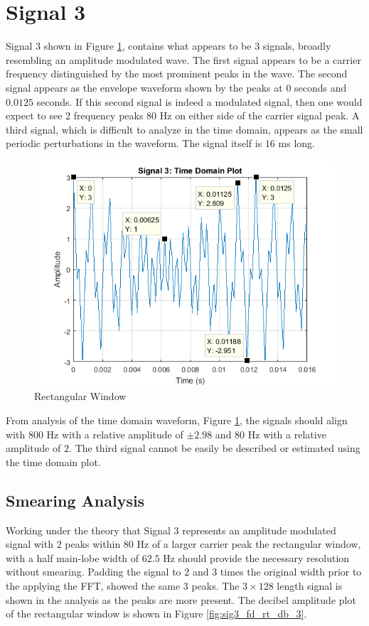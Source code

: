 \documentclass[pdftex, 10pt]{IEEEtran}
\begin{document}
\section{Signal 3}
Signal 3 shown in Figure \ref{fig:sig3_td}, contains what appears to be 3 signals, broadly resembling 
an amplitude modulated wave. The first signal appears to be a carrier frequency distinguished by the
most prominent peaks in the wave. The second signal appears as the envelope waveform shown by the
peaks at $0$ seconds and $0.0125$ seconds. If this second signal is indeed a
modulated signal, then one
would expect to see 2 frequency peaks $80$ Hz on either side of the carrier signal peak.
A third signal, which is difficult to analyze in the 
time domain, appears as the small periodic perturbations in the waveform. The signal itself is $16$
ms long.

\begin{figure}
    \centering
    \includegraphics[scale=0.5]{sig3_td}
    \caption{Rectangular Window}
    \label{fig:sig3_td}
\end{figure}

From analysis of the time domain waveform, Figure \ref{fig:sig3_td}, the signals should align 
with $800$ Hz with a relative amplitude of $\pm2.98$ and $80$ Hz with a relative amplitude of $2$.
The third signal cannot be easily be described or estimated using the time domain plot.

\subsection{Smearing Analysis}
Working under the theory that Signal 3 represents an amplitude modulated signal with $2$ peaks
within $80$ Hz of  a larger carrier peak the rectangular window, with a half main-lobe width of 
$62.5$ Hz should provide the necessary resolution without smearing.
Padding the signal to $2$ and $3$ times the original width prior to the applying the FFT, showed
the same 3 peaks. The $3\times128$ length signal is shown in the analysis as the peaks are more
present. The decibel amplitude plot of the rectangular window is shown in Figure \ref{fig:sig3_fd_rt_db_3}.
\end{document}

